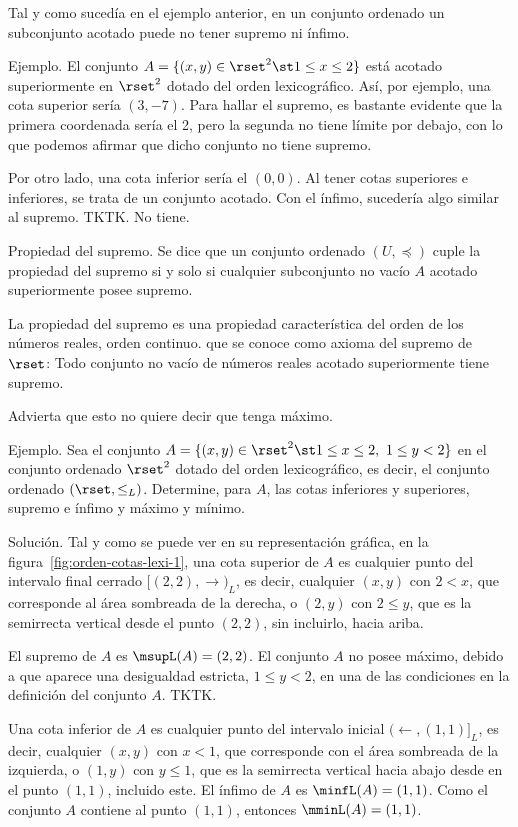 Tal y como sucedía en el ejemplo anterior, en un conjunto ordenado un
subconjunto acotado puede no tener supremo ni ínfimo.

Ejemplo. El conjunto $A = \{(x, y) \in \rset^2 \st 1 \leq x \leq 2\}$ está
acotado superiormente en $\rset^2$ dotado del orden lexicográfico. Así, por
ejemplo, una cota superior sería $(3, {-7})$. Para hallar el supremo, es
bastante evidente que la primera coordenada sería el 2, pero la segunda no
tiene límite por debajo, con lo que podemos afirmar que dicho conjunto no
tiene supremo.

Por otro lado, una cota inferior sería el $(0, 0)$. Al tener cotas
superiores e inferiores, se trata de un conjunto acotado. Con el ínfimo,
sucedería algo similar al supremo. TKTK. No tiene.

Propiedad del supremo. Se dice que un conjunto ordenado $(U, \preceq)$ cuple
la propiedad del supremo si y solo si cualquier subconjunto no vacío $A$
acotado superiormente posee supremo.

La propiedad del supremo es una propiedad característica del orden de los
números reales, orden continuo. que se conoce como axioma del supremo de
$\rset$: Todo conjunto no vacío de números reales acotado superiormente
tiene supremo.

Advierta que esto no quiere decir que tenga máximo.

Ejemplo. Sea el conjunto $A = \{(x, y) \in \rset^2 \st 1 \leq x \leq 2, \ 1
\leq y < 2\}$ en el conjunto ordenado $\rset^2$ dotado del orden
lexicográfico, es decir, el conjunto ordenado $(\rset, \leq_L)$. Determine,
para $A$, las cotas inferiores y superiores, supremo e ínfimo y máximo y
mínimo.

Solución. Tal y como se puede ver en su representación gráfica, en la
figura~\ref{fig:orden-cotas-lexi-1}, una cota superior de $A$ es cualquier
punto del intervalo final cerrado $[(2, 2), \rightarrow)_L$, es decir,
cualquier $(x, y)$ con $2 < x$, que corresponde al área sombreada de la
derecha, o $(2, y)$ con $2 \leq y$, que es la semirrecta vertical desde el
punto $(2, 2)$, sin incluirlo, hacia ariba.

El supremo de $A$ es $\msupL (A) = (2, 2)$. El conjunto $A$ no posee máximo,
debido a que aparece una desigualdad estricta, $1 \leq y < 2$, en una de las
condiciones en la definición del conjunto $A$. TKTK.

Una cota inferior de $A$ es cualquier punto del intervalo inicial
$(\leftarrow, (1, 1)]_L$, es decir, cualquier $(x, y)$ con $x < 1$, que
corresponde con el área sombreada de la izquierda, o $(1, y)$ con $y \leq
1$, que es la semirrecta vertical hacia abajo desde en el punto $(1, 1)$,
incluido este. El ínfimo de $A$ es $\minfL(A) = (1, 1)$. Como el conjunto
$A$ contiene al punto $(1, 1)$, entonces $\mminL(A) = (1, 1)$.

